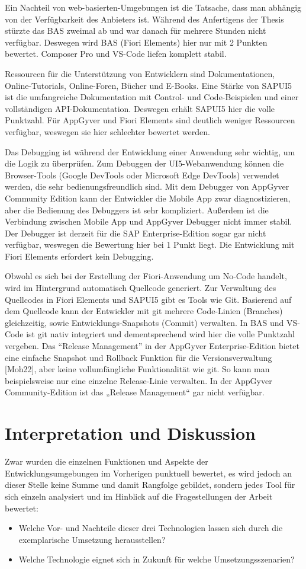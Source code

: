 Ein Nachteil von web-basierten-Umgebungen ist die Tatsache, dass man abhängig von der Verfügbarkeit des Anbieters ist. Während des Anfertigens der Thesis stürzte das BAS zweimal ab und war danach für mehrere Stunden nicht verfügbar. Deswegen wird BAS (Fiori Elements) hier nur mit 2 Punkten bewertet. Composer Pro und VS-Code liefen komplett stabil.

Ressourcen für die Unterstützung von Entwicklern sind Dokumentationen, Online-Tutorials, Online-Foren, Bücher und E-Books. Eine Stärke von SAPUI5 ist die umfangreiche Dokumentation mit Control- und Code-Beispielen und einer vollständigen API-Dokumentation. Deswegen erhält SAPUI5 hier die volle Punktzahl. Für AppGyver und Fiori Elements sind deutlich weniger Ressourcen verfügbar, weswegen sie hier schlechter bewertet werden.

Das Debugging ist während der Entwicklung einer Anwendung sehr wichtig, um die Logik zu überprüfen. Zum Debuggen der UI5-Webanwendung können die Browser-Tools (Google DevTools oder Microsoft Edge DevTools) verwendet werden, die sehr bedienungsfreundlich sind. Mit dem Debugger von AppGyver Community Edition kann der Entwickler die Mobile App zwar diagnostizieren, aber die Bedienung des Debuggers ist sehr kompliziert. Außerdem ist die Verbindung zwischen Mobile App und AppGyver Debugger nicht immer stabil. Der Debugger ist derzeit für die SAP Enterprise-Edition sogar gar nicht verfügbar, weswegen die Bewertung hier bei 1 Punkt liegt. Die Entwicklung mit Fiori Elements erfordert kein Debugging.

Obwohl es sich bei der Erstellung der Fiori-Anwendung um No-Code handelt, wird im Hintergrund automatisch Quellcode generiert. Zur Verwaltung des Quellcodes in Fiori Elements und SAPUI5 gibt es Tools wie Git. Basierend auf dem Quellcode kann der Entwickler mit git mehrere Code-Linien (Branches) gleichzeitig, sowie Entwicklungs-Snapshots (Commit) verwalten. In BAS und VS-Code ist git nativ integriert und dementsprechend wird hier die volle Punktzahl vergeben. Das “Release Management” in der AppGyver Enterprise-Edition bietet eine einfache Snapshot und Rollback Funktion für die Versionsverwaltung [Moh22], aber keine vollumfängliche Funktionalität wie git. So kann man beispielsweise nur eine einzelne Release-Linie verwalten. In der AppGyver Community-Edition ist das „Release Management“ gar nicht verfügbar. 

\section{Interpretation und Diskussion}
Zwar wurden die einzelnen Funktionen und Aspekte der Entwicklungsumgebungen im Vorherigen punktuell bewertet, es wird jedoch an dieser Stelle keine Summe und damit Rangfolge gebildet, sondern jedes Tool für sich einzeln analysiert und im Hinblick auf die Fragestellungen der Arbeit bewertet:
\begin{itemize}[noitemsep]
\item Welche Vor- und Nachteile dieser drei Technologien lassen sich durch die exemplarische Umsetzung herausstellen? 
\item Welche Technologie eignet sich in Zukunft für welche Umsetzungsszenarien?
\end{itemize}

